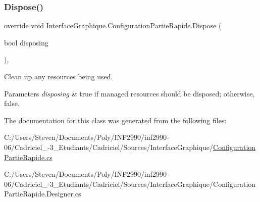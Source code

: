 \subsubsection{\texorpdfstring{Dispose()}{Dispose()}}
{\footnotesize\ttfamily override void Interface\+Graphique.\+Configuration\+Partie\+Rapide.\+Dispose (\begin{DoxyParamCaption}\item[{bool}]{disposing }\end{DoxyParamCaption})\hspace{0.3cm}{\ttfamily [inline]}, {\ttfamily [protected]}}



Clean up any resources being used. 


\begin{DoxyParams}{Parameters}
{\em disposing} & true if managed resources should be disposed; otherwise, false.\\
\hline
\end{DoxyParams}


The documentation for this class was generated from the following files\+:\begin{DoxyCompactItemize}
\item 
C\+:/\+Users/\+Steven/\+Documents/\+Poly/\+I\+N\+F2990/inf2990-\/06/\+Cadriciel\+\_-\/3\+\_\+\+Etudiants/\+Cadriciel/\+Sources/\+Interface\+Graphique/\hyperlink{_configuration_partie_rapide_8cs}{Configuration\+Partie\+Rapide.\+cs}\item 
C\+:/\+Users/\+Steven/\+Documents/\+Poly/\+I\+N\+F2990/inf2990-\/06/\+Cadriciel\+\_-\/3\+\_\+\+Etudiants/\+Cadriciel/\+Sources/\+Interface\+Graphique/Configuration\+Partie\+Rapide.\+Designer.\+cs\end{DoxyCompactItemize}
